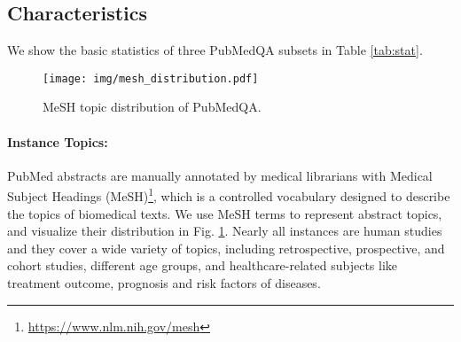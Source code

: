 \documentclass[11pt,a4paper]{article}
\begin{document}
\subsection{Characteristics}

We show the basic statistics of three PubMedQA subsets in Table \ref{tab:stat}.

\begin{figure}
    \centering
    \texttt{[image: img/mesh\_distribution.pdf]}
    \vskip -0.15cm
    \caption{MeSH topic distribution of PubMedQA.}
    \label{fig:mesh}
    \vspace{-0.5em}
\end{figure}


\paragraph{Instance Topics:} PubMed abstracts are manually annotated by medical librarians with Medical Subject Headings (MeSH)\footnote{\url{https://www.nlm.nih.gov/mesh}}, which is a controlled vocabulary designed to describe the topics of biomedical texts. We use MeSH terms to represent abstract topics, and visualize their distribution in Fig. \ref{fig:mesh}. Nearly all instances are human studies and they cover a wide variety of topics, including retrospective, prospective, and cohort studies, different age groups, and healthcare-related subjects like treatment outcome, prognosis and risk factors of diseases.
\end{document}
